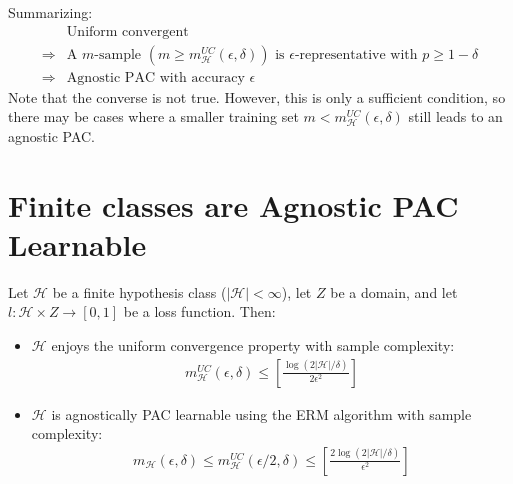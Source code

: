 \documentclass[../template.tex]{subfiles}
\begin{document}
Summarizing:
\begin{align*}
    &\text{Uniform convergent}\\ \Rightarrow& \text{A $m$-sample $(m\geq m_{\mathcal{H}}^{UC}(\epsilon, \delta))$  is $\epsilon$-representative with $p\geq 1-\delta$}\\
    \Rightarrow& \text{Agnostic PAC with accuracy $\epsilon$}
\end{align*}
Note that the converse is not true. However, this is only a sufficient condition, so there may be cases where a smaller training set $m < m_{\mathcal{H}}^{UC}(\epsilon, \delta)$ still leads to an agnostic PAC.

\section{Finite classes are Agnostic PAC Learnable}
Let $\mathcal{H}$ be a finite hypothesis class ($|\mathcal{H}| < \infty$), let $Z$ be a domain, and let $l\colon \mathcal{H}\times Z \to [0,1]$ be a loss function. Then:
\begin{itemize}
    \item $\mathcal{H}$ enjoys the uniform convergence property with sample complexity:
    \begin{align*}
        m_{\mathcal{H}}^{UC}(\epsilon, \delta) \leq \left[\frac{\log(2|\mathcal{H}|/\delta)}{2 \epsilon^2} \right]
    \end{align*} 
    \item $\mathcal{H}$ is agnostically PAC learnable using the ERM algorithm with sample complexity:
    \begin{align*}
        m_{\mathcal{H}}(\epsilon, \delta) \leq m_{\mathcal{H}}^{UC}(\epsilon/2, \delta) \leq \left[\frac{2 \log(2|\mathcal{H}|/\delta)}{\epsilon^2} \right]
    \end{align*} 
\end{itemize}
\end{document}
